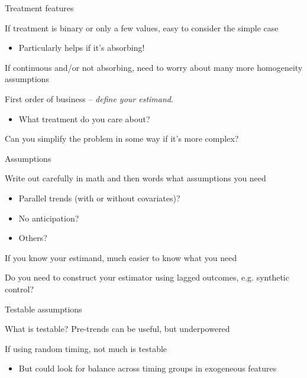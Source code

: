 \documentclass[notes,11pt, aspectratio=169]{beamer}
\newenvironment{wideitemize}{\itemize\addtolength{\itemsep}{10pt}}{\enditemize}
\begin{document}
\begin{frame}{Treatment features}
  \begin{wideitemize}
  \item If treatment is binary or only a few values, easy to consider the simple case
    \begin{itemize}
    \item Particularly helps if it's absorbing!
    \end{itemize}
  \item If continuous and/or not absorbing, need to worry about many more homogeneity assumptions
  \item First order of business -- \emph{define your estimand}.
    \begin{itemize}
    \item What treatment do you care about?
    \end{itemize}
  \item Can you simplify the problem in some way if it's more complex?
  \end{wideitemize}
\end{frame}

\begin{frame}{Assumptions}
  \begin{wideitemize}
  \item Write out carefully in math and then words what assumptions you need
    \begin{itemize}
    \item Parallel trends (with or without covariates)?
    \item No anticipation?
    \item Others?
    \end{itemize}
  \item If you know your estimand, much easier to know what you need
  \item Do you need to construct your estimator using lagged outcomes, e.g. synthetic control? 
  \end{wideitemize}
\end{frame}

\begin{frame}{Testable assumptions}
  \begin{wideitemize}
  \item What is testable? Pre-trends can be useful, but underpowered
  \item If using random timing, not much is testable
    \begin{itemize}
    \item But could look for balance across timing groups in exogeneous features
    \end{itemize}
  \end{wideitemize}
\end{frame}
\end{document}
